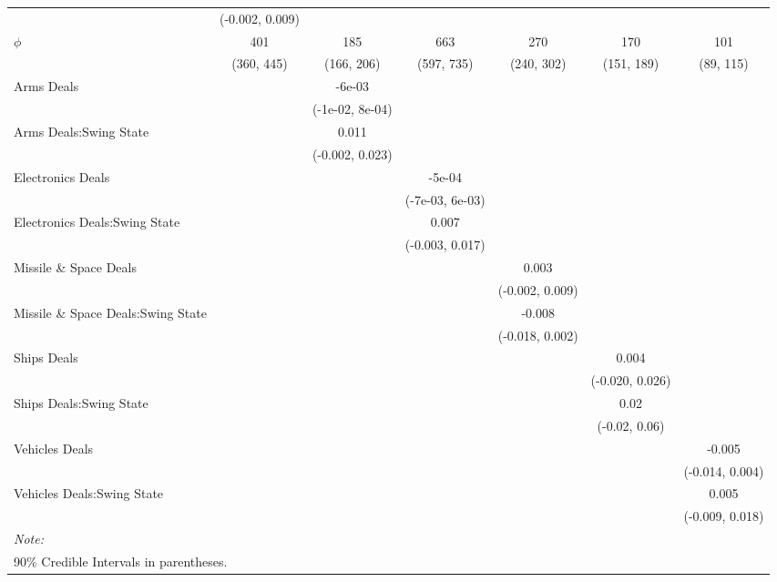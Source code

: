 \begin{table}[H]
{\begin{tabular}[t]{lcccccc}
 & (-0.002, 0.009) &  &  &  &  & \\
$\phi$ & 401 & 185 & 663 & 270 & 170 & 101\\
 & (360, 445) & (166, 206) & (597, 735) & (240, 302) & (151, 189) & (89, 115)\\
Arms Deals &  & -6e-03 &  &  &  & \\
 &  & (-1e-02, 8e-04) &  &  &  & \\
Arms Deals:Swing State &  & 0.011 &  &  &  & \\
 &  & (-0.002, 0.023) &  &  &  & \\
Electronics Deals &  &  & -5e-04 &  &  & \\
 &  &  & (-7e-03, 6e-03) &  &  & \\
Electronics Deals:Swing State &  &  & 0.007 &  &  & \\
 &  &  & (-0.003, 0.017) &  &  & \\
Missile \& Space Deals &  &  &  & 0.003 &  & \\
 &  &  &  & (-0.002, 0.009) &  & \\
Missile \& Space Deals:Swing State &  &  &  & -0.008 &  & \\
 &  &  &  & (-0.018, 0.002) &  & \\
Ships Deals &  &  &  &  & 0.004 & \\
 &  &  &  &  & (-0.020, 0.026) & \\
Ships Deals:Swing State &  &  &  &  & 0.02 & \\
 &  &  &  &  & (-0.02, 0.06) & \\
Vehicles Deals &  &  &  &  &  & -0.005\\
 &  &  &  &  &  & (-0.014, 0.004)\\
Vehicles Deals:Swing State &  &  &  &  &  & 0.005\\
 &  &  &  &  &  & (-0.009, 0.018)\\
\bottomrule
\multicolumn{7}{l}{\rule{0pt}{1em}\textit{Note: }}\\
\multicolumn{7}{l}{\rule{0pt}{1em}90\% Credible Intervals in parentheses.}\\
\end{tabular}}
\end{table}
